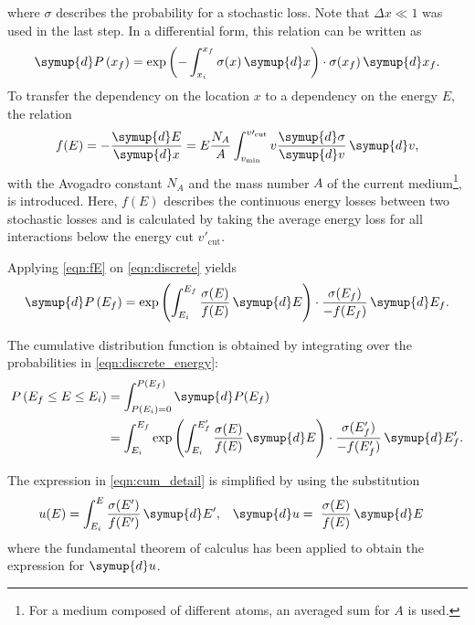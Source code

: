 where $\sigma$ describes the probability for a stochastic loss. 
Note that $\Delta x \ll 1$ was used in the last step. 
In a differential form, this relation can be written as
\begin{equation}
	\label{eqn:discrete}
	\symup{d}P\left( x_f \right) = \exp\left(-\int_{x_i}^{x_f} \sigma(x) \, \symup{d}x \right) \cdot \sigma(x_f) \, \symup{d} x_f.
\end{equation}
%
To transfer the dependency on the location $x$ to a dependency on the energy $E$, the relation
%
\begin{equation}
	\label{eqn:fE}
	f(E) = -\frac{\symup{d}E}{\symup{d}x} = E \frac{N_A}{A} \int_{v_\text{min}}^{v\prime_\text{cut}} v \frac{\symup{d}\sigma}{\symup{d}v} \, \symup{d}v,
\end{equation}
%
with the Avogadro constant $N_A$ and the mass number $A$ of the current medium\footnote{For a medium composed of different atoms, an averaged sum for $A$ is used.}, is introduced.
Here, $f(E)$ describes the continuous energy losses between two stochastic losses and is calculated by taking the average energy loss for all interactions below the energy cut $v\prime_\text{cut}$.

Applying \eqref{eqn:fE} on \eqref{eqn:discrete} yields
%
\begin{equation}
	\label{eqn:discrete_energy}
	\symup{d}P\left(E_f\right) = \exp \left( \int_{E_i}^{E_f} \frac{\sigma(E)}{ f(E) } \, \symup{d}E \right) \cdot \frac{\sigma(E_f)}{-f(E_f)} \, \symup{d}E_f.
\end{equation}

The cumulative distribution function is obtained by integrating over the probabilities in \eqref{eqn:discrete_energy}:
%
\begin{equation}
	\label{eqn:cum_detail}
	\begin{split}
	P\left(E_f \leq E \leq E_i\right) &= \int_{P(E_i)=0}^{P(E_f)} \symup{d}P(E_f)\\
	&= \int_{E_i}^{E_f} \exp \left( \int_{E_i}^{E_f'} \frac{\sigma(E)}{ f(E) } \, \symup{d}E \right) \cdot \frac{\sigma(E'_f)}{-f(E'_f)} \, \symup{d}E'_f.
	\end{split}
\end{equation}

The expression in \eqref{eqn:cum_detail} is simplified by using the substitution
%
\begin{align}
	u(E) &= \int_{E_i}^{E} \frac{\sigma(E')}{f(E')} \, \symup{d}E', & \symup{d}u &= \frac{\sigma(E)}{f(E)} \, \symup{d}E
\end{align}
%
where the fundamental theorem of calculus has been applied to obtain the expression for $\symup{d}u$.

